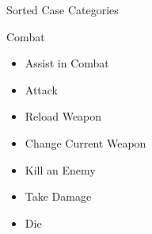 \documentclass[12pt]{article}
\begin{document}
\begin{section}{Sorted Case Categories}
\begin{subsection}{Combat}
\begin{itemize}
\item Assist in Combat
\item Attack
\item Reload Weapon
\item Change Current Weapon
\item Kill an Enemy
\item Take Damage
\item Die
\end{itemize}
\end{subsection}
\end{section}
\end{document}

